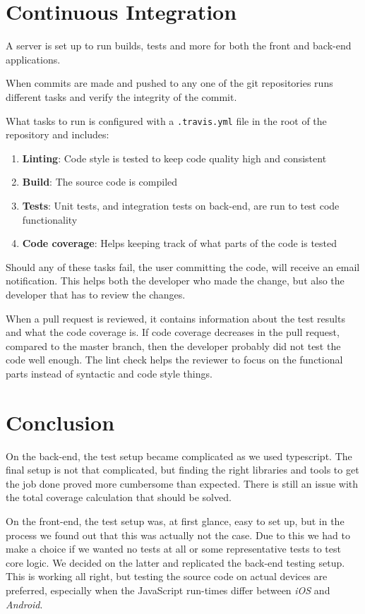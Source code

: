 \section{Continuous Integration}
A  server is set up to run builds, tests and more for both the front and back-end applications.

When commits are made and pushed to any one of the git repositories  runs different tasks and verify the integrity of the commit.

What tasks to run is configured with a \verb+.travis.yml+ file in the root of the repository and includes:

\begin{enumerate}
\item \textbf{Linting}: Code style is tested to keep code quality high and consistent
\item \textbf{Build}: The source code is compiled
\item \textbf{Tests}: Unit tests, and integration tests on back-end, are run to test code functionality
\item \textbf{Code coverage}: Helps keeping track of what parts of the code is tested
\end{enumerate} 

Should any of these tasks fail, the user committing the code, will receive an email notification.
This helps both the developer who made the change, but also the developer that has to review the changes.

When a pull request is reviewed, it contains information about the test results and what the code coverage is.
If code coverage decreases in the pull request, compared to the master branch, then the developer probably did not test the code well enough. 
The lint check helps the reviewer to focus on the functional parts instead of syntactic and code style things.

\section{Conclusion}
On the back-end, the test setup became complicated as we used \gls{typescript}.
The final setup is not that complicated, but finding the right libraries and tools to get the job done proved more cumbersome than expected.
There is still an issue with the total coverage calculation that should be solved.

On the front-end, the test setup was, at first glance, easy to set up, but in the process we found out that this was actually not the case.
Due to this we had to make a choice if we wanted no tests at all or some representative tests to test core logic.
We decided on the latter and replicated the back-end testing setup.
This is working all right, but testing the source code on actual devices are preferred, especially when the JavaScript run-times differ between \textit{iOS} and \textit{Android}.

